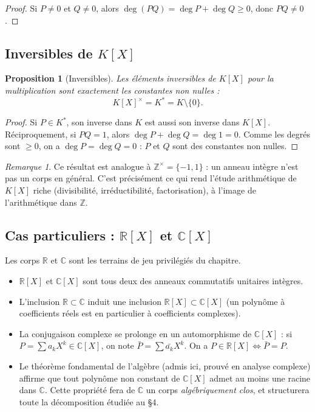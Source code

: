 \documentclass[12pt,a4paper]{report}
\newtheorem{proposition}[theoreme]{Proposition}
\theoremstyle{definition}
\theoremstyle{remark}
\newtheorem{remarque}{Remarque}[section]
\begin{document}
\begin{proof}
Si $P \neq 0$ et $Q \neq 0$, alors $\deg(PQ) = \deg P + \deg Q \ge 0$, donc $PQ \neq 0$.
\end{proof}

\subsection{Inversibles de $K[X]$}

\begin{proposition}[Inversibles]
Les éléments inversibles de $K[X]$ pour la multiplication sont exactement les \emph{constantes non nulles} :
\[ K[X]^\times = K^* = K \setminus \{0\}. \]
\end{proposition}

\begin{proof}
Si $P \in K^*$, son inverse dans $K$ est aussi son inverse dans $K[X]$.
Réciproquement, si $PQ = 1$, alors $\deg P + \deg Q = \deg 1 = 0$. Comme les degrés sont $\ge 0$, on a $\deg P = \deg Q = 0$ : $P$ et $Q$ sont des constantes non nulles.
\end{proof}

\begin{remarque}
Ce résultat est analogue à $\mathbb{Z}^\times = \{-1, 1\}$ : un anneau intègre n'est pas un corps en général. C'est précisément ce qui rend l'étude arithmétique de $K[X]$ riche (divisibilité, irréductibilité, factorisation), à l'image de l'arithmétique dans $\mathbb{Z}$.
\end{remarque}

\subsection{Cas particuliers : $\mathbb{R}[X]$ et $\mathbb{C}[X]$}

Les corps $\mathbb{R}$ et $\mathbb{C}$ sont les terrains de jeu privilégiés du chapitre.

\begin{itemize}
    \item $\mathbb{R}[X]$ et $\mathbb{C}[X]$ sont tous deux des anneaux commutatifs unitaires intègres.
    \item L'inclusion $\mathbb{R} \subset \mathbb{C}$ induit une inclusion $\mathbb{R}[X] \subset \mathbb{C}[X]$ (un polynôme à coefficients réels est en particulier à coefficients complexes).
    \item La conjugaison complexe se prolonge en un automorphisme de $\mathbb{C}[X]$ : si $P = \sum a_k X^k \in \mathbb{C}[X]$, on note $\bar{P} = \sum \bar{a_k} X^k$. On a $P \in \mathbb{R}[X] \iff \bar{P} = P$.
    \item Le théorème fondamental de l'algèbre (admis ici, prouvé en analyse complexe) affirme que tout polynôme non constant de $\mathbb{C}[X]$ admet au moins une racine dans $\mathbb{C}$. Cette propriété fera de $\mathbb{C}$ un corps \emph{algébriquement clos}, et structurera toute la décomposition étudiée au §4.
\end{itemize}
\end{document}
